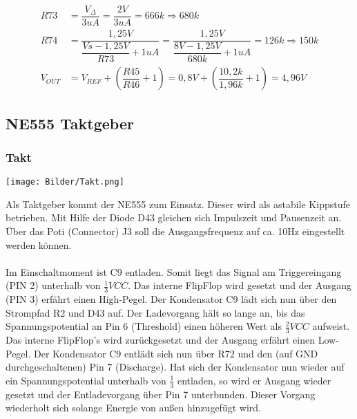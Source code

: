 \documentclass[a4paper,11pt]{scrartcl}
\begin{document}
\begin{center}
\begin{align}
	R73 &= \dfrac{V_{\Delta}}{3uA} = \dfrac{2V}{3uA} = 666k  \Rightarrow 680k\\
	R74 &= \dfrac{1,25V}{\dfrac{Vs - 1,25V}{R73} + 1uA} = \dfrac{1,25V}{\dfrac{8V - 1,25V}{680k} + 1uA} = 126k \Rightarrow 150k	\\
	V_{OUT}	&= V_{REF} + (\dfrac{R45}{R46} + 1) = 0,8V + (\dfrac{10,2k}{1,96k} + 1) = 4,96V
\end{align}
\end{center}


\newpage


\subsection{NE555 Taktgeber}

\subsubsection{Takt}

\begin{center}
\texttt{[image: Bilder/Takt.png]}
\end{center}

Als Taktgeber kommt der \glqq NE555 \grqq{} zum Einsatz. Dieser wird als astabile Kippstufe betrieben. Mit Hilfe der Diode D43 gleichen sich Impulszeit und Pausenzeit an. Über das Poti (Connector) J3 soll die Ausgangsfrequenz auf ca. 10Hz eingestellt werden können. 
\\
\\
Im Einschaltmoment ist C9 entladen. Somit liegt das Signal am Triggereingang (PIN 2) unterhalb von $\frac{1}{3} VCC$. Das interne FlipFlop wird gesetzt und der Ausgang (PIN 3) erfährt einen High-Pegel. Der Kondensator C9 lädt sich nun über den Strompfad R2 und D43 auf. Der Ladevorgang hält so lange an, bis das Spannungspotential an Pin 6 (Threshold) einen höheren Wert als $\frac{2}{3} VCC$ aufweist. Das interne FlipFlop's wird zurückgesetzt und der Ausgang erfährt einen Low-Pegel. Der Kondensator C9 entlädt sich nun über R72 und den (auf GND durchgeschaltenen) Pin 7 (Discharge). Hat sich der Kondensator nun wieder auf ein Spannungspotential unterhalb von $\frac{1}{3}$ entladen, so wird er Ausgang wieder gesetzt und der Entladevorgang über Pin 7 unterbunden. Dieser Vorgang wiederholt sich solange Energie von außen hinzugefügt wird. 
\end{document}
